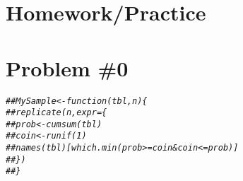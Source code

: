 \documentclass[12pt]{article}\usepackage[]{graphicx}\usepackage[]{color}
\makeatletter
\newcommand{\hlcom}[1]{\textcolor[rgb]{0.678,0.584,0.686}{\textit{#1}}}%
\newenvironment{kframe}{%
 \def\at@end@of@kframe{}%
 \ifinner\ifhmode%
  \def\at@end@of@kframe{\end{minipage}}%
  \begin{minipage}{\columnwidth}%
 \fi\fi%
 \def\FrameCommand##1{\hskip\@totalleftmargin \hskip-\fboxsep
 \colorbox{shadecolor}{##1}\hskip-\fboxsep
     \hskip-\linewidth \hskip-\@totalleftmargin \hskip\columnwidth}%
 \MakeFramed {\advance\hsize-\width
   \@totalleftmargin\z@ \linewidth\hsize
   \@setminipage}}%
 {\par\unskip\endMakeFramed%
 \at@end@of@kframe}
\newenvironment{knitrout}{}{} %
\makeatother
\begin{document}
\section{Homework/Practice}
\section{Problem \#0} 

\begin{knitrout}
\color{fgcolor}\begin{kframe}
\begin{alltt}
\hlcom{## MySample <- function(tbl, n) \{}
\hlcom{##     replicate(n, expr = \{}
\hlcom{##         prob <- cumsum(tbl)}
\hlcom{##         coin <- runif(1)}
\hlcom{##         names(tbl)[which.min(prob >= coin & coin <= prob)]}
\hlcom{##     \})}
\hlcom{## \}}
\end{alltt}
\end{kframe}
\end{knitrout}
\end{document}
